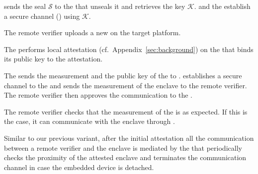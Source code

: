 \begin{mylist}


  \item[\one] \device sends the seal $\mathcal{S}$ to the \nameclave that unseals it and retrieves the key $\mathcal{K}$. \device and the \nameclave establish a secure channel (\tls) using $\mathcal{K}$.

  \item[\two] The remote verifier uploads a new \app on the target platform.

  \item[\three] The \nameclave performs local attestation (cf.~Appendix~\ref{sec:background}) on the \app that binds its public key to the attestation. %

  \item[\four] The \nameclave sends the measurement and the public key of the \app to \device. \device establishes a secure channel to the \app and sends the measurement of the enclave to the remote verifier. The remote verifier then approves the communication to the \app.

  \item[\five] The remote verifier checks that the measurement of the \app is as expected. If this is the case, it can communicate with the enclave through \device.

\end{mylist}

\ifusenix
\vspace{-15pt}
\else
\fi
{} Similar to our previous variant, after the initial attestation all the communication between a remote verifier and the enclave is mediated by the \device that periodically checks the proximity of the attested enclave and terminates the communication channel in case the embedded device is detached.
